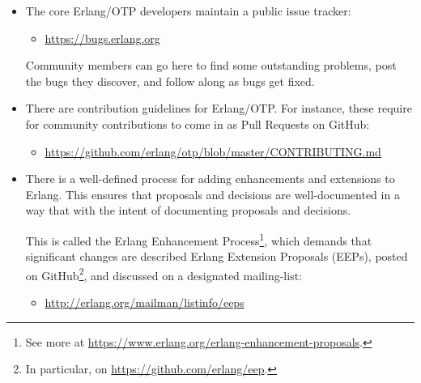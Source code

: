 \begin{itemize}
\item The core Erlang/OTP developers maintain a public issue tracker:

\begin{itemize}

\item \url{https://bugs.erlang.org}

\end{itemize}

Community members can go here to find some outstanding problems, post
the bugs they discover, and follow along as bugs get fixed.

\item There are contribution guidelines for Erlang/OTP. For instance,
these require for community contributions to come in as Pull Requests
on GitHub:

\begin{itemize}

\item \url{https://github.com/erlang/otp/blob/master/CONTRIBUTING.md}

\end{itemize}

\item There is a well-defined process for adding enhancements and
extensions to Erlang. This ensures that proposals and decisions are
well-documented in a way that with the intent of documenting proposals
and decisions.

This is called the Erlang Enhancement Process\footnote{See more at
\url{https://www.erlang.org/erlang-enhancement-proposals}.}, which
demands that significant changes are described Erlang Extension
Proposals (EEPs), posted on GitHub\footnote{In particular, on
\url{https://github.com/erlang/eep}.}, and discussed on a designated
mailing-list:

\begin{itemize}

\item \url{http://erlang.org/mailman/listinfo/eeps}

\end{itemize}

\end{itemize}
